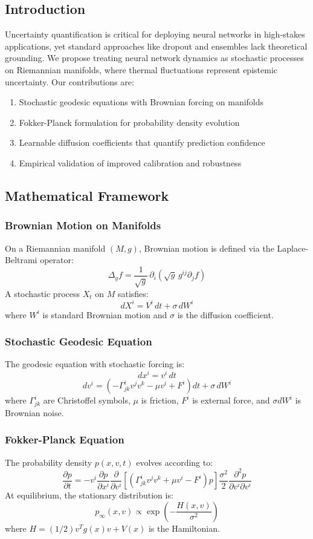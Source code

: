 \documentclass{article}
\numberwithin{equation}{section}
\begin{document}
\subsection{Introduction}
Uncertainty quantification is critical for deploying neural networks in high-stakes applications, yet standard approaches like dropout and ensembles lack theoretical grounding. We propose treating neural network dynamics as stochastic processes on Riemannian manifolds, where thermal fluctuations represent epistemic uncertainty.
Our contributions are:
\begin{enumerate}
\item Stochastic geodesic equations with Brownian forcing on manifolds
\item Fokker-Planck formulation for probability density evolution
\item Learnable diffusion coefficients that quantify prediction confidence
\item Empirical validation of improved calibration and robustness
\end{enumerate}

\subsection{Mathematical Framework}
\subsubsection{Brownian Motion on Manifolds}
On a Riemannian manifold $(M, g)$, Brownian motion is defined via the Laplace-Beltrami operator:
\[
\Delta_g f = \frac{1}{\sqrt{g}}\,\partial_i\!\left(\sqrt{g}\,g^{ij}\partial_j f\right)
\]
A stochastic process $X_t$ on $M$ satisfies:
\[
dX^i = V^i\,dt + \sigma\,dW^i
\]
where $W^i$ is standard Brownian motion and $\sigma$ is the diffusion coefficient.

\subsubsection{Stochastic Geodesic Equation}
The geodesic equation with stochastic forcing is:
\[
dx^i = v^i\,dt
\]
\[
dv^i = \left(-\Gamma^i_{jk} v^j v^k - \mu v^i + F^i\right)dt + \sigma\,dW^i
\]
where $\Gamma^i_{jk}$ are Christoffel symbols, $\mu$ is friction, $F^i$ is external force, and $\sigma dW^i$ is Brownian noise.

\subsubsection{Fokker-Planck Equation}
The probability density $p(x, v, t)$ evolves according to:
\[
\frac{\partial p}{\partial t}
= -v^i \frac{\partial p}{\partial x^i}
 \frac{\partial}{\partial v^i}\!\left[\left(\Gamma^i_{jk} v^j v^k + \mu v^i - F^i\right)p\right]
 \frac{\sigma^2}{2}\frac{\partial^2 p}{\partial v^i \partial v^i}
\]
At equilibrium, the stationary distribution is:
\[
p_\infty(x, v) \propto \exp\!\left(-\frac{H(x, v)}{\sigma^2}\right)
\]
where $H = (1/2)v^T g(x) v + V(x)$ is the Hamiltonian.
\end{document}
